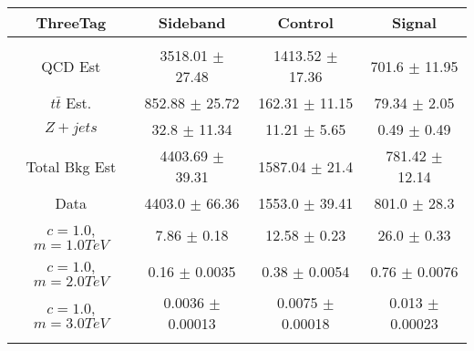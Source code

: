 \begin{footnotesize} 
\begin{tabular}{c|c|c|c} 
ThreeTag & Sideband & Control & Signal \\ 
\hline\hline 
& & & \\ 
QCD Est & 3518.01 $\pm$ 27.48 & 1413.52 $\pm$ 17.36 & 701.6 $\pm$ 11.95\\ 
$t\bar{t}$ Est.  & 852.88 $\pm$ 25.72 & 162.31 $\pm$ 11.15 & 79.34 $\pm$ 2.05\\ 
$Z+jets$ & 32.8 $\pm$ 11.34 & 11.21 $\pm$ 5.65 & 0.49 $\pm$ 0.49\\ 
Total Bkg Est & 4403.69 $\pm$ 39.31 & 1587.04 $\pm$ 21.4 & 781.42 $\pm$ 12.14\\ 
Data & 4403.0 $\pm$ 66.36 & 1553.0 $\pm$ 39.41 & 801.0 $\pm$ 28.3\\ 
$c=1.0$,$m=1.0TeV$ & 7.86 $\pm$ 0.18 & 12.58 $\pm$ 0.23 & 26.0 $\pm$ 0.33\\ 
$c=1.0$,$m=2.0TeV$ & 0.16 $\pm$ 0.0035 & 0.38 $\pm$ 0.0054 & 0.76 $\pm$ 0.0076\\ 
$c=1.0$,$m=3.0TeV$ & 0.0036 $\pm$ 0.00013 & 0.0075 $\pm$ 0.00018 & 0.013 $\pm$ 0.00023\\ 
& & & \\ 
\hline\hline 
\end{tabular} 
\end{footnotesize} 
\newline 
